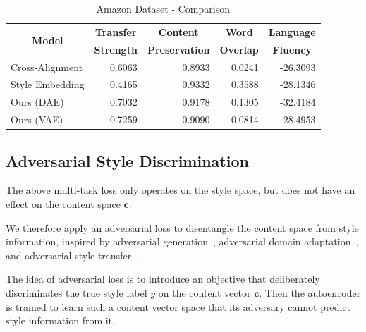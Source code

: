 \documentclass[11pt,a4paper]{article}
\newcommand{\tabh}[1]{\multicolumn{1}{c|}{\textbf{#1}}}
\newcommand{\tabc}[2]{\multicolumn{1}{|c|}{\multirow{#1}{*}{\textbf{#2}}}}
\begin{document}
\begin{table}[ht]
	\centering
	\begin{tabular}{| l | r | r | r | r |}
		\hline
		\tabc{2}{Model}                       & \tabh{Transfer} & \tabh{Content}      & \tabh{Word}    & \tabh{Language} \\
		                                      & \tabh{Strength} & \tabh{Preservation} & \tabh{Overlap} & \tabh{Fluency}  \\
		\hline
		\hline
		Cross-Alignment \citep{shen2017style} & 0.6063          & 0.8933              & 0.0241         & -26.3093        \\
		\hline
		Style Embedding \citep{fu2017style}   & 0.4165          & 0.9332              & 0.3588         & -28.1346        \\
		\hline
		Ours (DAE)                            & 0.7032          & 0.9178              & 0.1305         & -32.4184        \\
		\hline
		Ours (VAE)                            & 0.7259          & 0.9090              & 0.0814         & -28.4953        \\
		\hline
	\end{tabular}
	\caption{Amazon Dataset - Comparison}
	\label{tab:amazon-comparison-previous}
\end{table}


\subsection{Adversarial Style Discrimination} \label{ssec:adversarial-style-objective}

The above multi-task loss only operates on the style space, but does not have an effect on the content space $\bm c$.

We therefore apply an adversarial loss to disentangle the content space from style information, inspired by adversarial generation~\cite{goodfellow2014generative}, adversarial domain adaptation~\cite{liu2017adversarial}, and adversarial style transfer~\cite{fu2017style}.

The idea of adversarial loss is to introduce an objective that deliberately discriminates the true style label $y$ on the content vector $\bm c$. Then the autoencoder is trained to learn such a content vector space that its adversary cannot predict style information from it.
\end{document}
